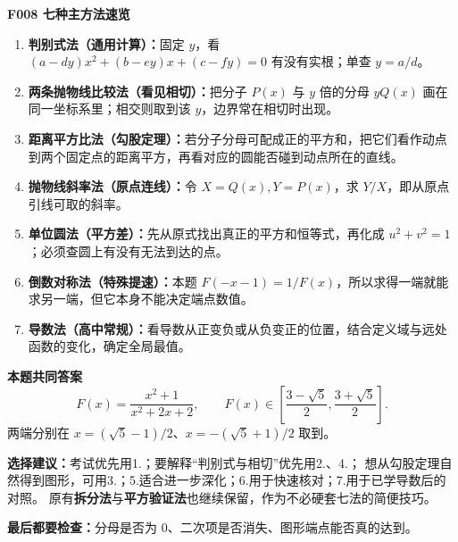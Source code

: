 \clearpage
\begin{summarybox}
\textbf{\textcolor{CSummary}{F008 七种主方法速览}}

\begin{enumerate}[leftmargin=*,itemsep=0.5em]
  \item \textbf{判别式法（通用计算）：}固定 $y$，看 $(a-dy)x^2+(b-ey)x+(c-fy)=0$ 有没有实根；单查 $y=a/d$。
  \item \textbf{两条抛物线比较法（看见相切）：}把分子 $P(x)$ 与 $y$ 倍的分母 $yQ(x)$ 画在同一坐标系里；相交则取到该 $y$，边界常在相切时出现。
  \item \textbf{距离平方比法（勾股定理）：}若分子分母可配成正的平方和，把它们看作动点到两个固定点的距离平方，再看对应的圆能否碰到动点所在的直线。
  \item \textbf{抛物线斜率法（原点连线）：}令 $X=Q(x),Y=P(x)$，求 $Y/X$，即从原点引线可取的斜率。
  \item \textbf{单位圆法（平方差）：}先从原式找出真正的平方和恒等式，再化成 $u^2+v^2=1$；必须查圆上有没有无法到达的点。
  \item \textbf{倒数对称法（特殊提速）：}本题 $F(-x-1)=1/F(x)$，所以求得一端就能求另一端，但它本身不能决定端点数值。
  \item \textbf{导数法（高中常规）：}看导数从正变负或从负变正的位置，结合定义域与远处函数的变化，确定全局最值。
\end{enumerate}

\medskip
\textbf{\textcolor{CSummary}{本题共同答案}}
\[
 F(x)=\frac{x^2+1}{x^2+2x+2},\qquad
 \boxed{F(x)\in\left[\frac{3-\sqrt5}{2},\frac{3+\sqrt5}{2}\right].}
\]
两端分别在 $x=(\sqrt5-1)/2$、$x=-(\sqrt5+1)/2$ 取到。

\medskip
\textbf{选择建议：}考试优先用1.；要解释“判别式与相切”优先用2.、4.；
想从勾股定理自然得到图形，可用3.；5.适合进一步深化；6.用于快速核对；7.用于已学导数后的对照。
原有\textbf{拆分法}与\textbf{平方验证法}也继续保留，作为不必硬套七法的简便技巧。

\textbf{最后都要检查：}分母是否为 $0$、二次项是否消失、图形端点能否真的达到。
\end{summarybox}
